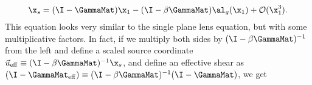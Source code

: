 \begin{equation}
\label{eqn:background}
\x_s = (\I - \GammaMat) \x_1  - (\I - \beta \GammaMat)\al_g(\x_1) + \mathcal{O}(\x_1^3).
\end{equation}
This equation looks very similar to the single plane lens equation, but with some multiplicative factors. In fact, if we multiply both sides by $(\I - \beta \GammaMat)^{-1}$ from the left and define a scaled source coordinate $\vec{u}_{\rm eff} \equiv (\I - \beta \GammaMat)^{-1} \x_s$, and define an effective shear as $(\I -\GammaMat_{\rm eff}) \equiv (\I - \beta\GammaMat)^{-1} (\I - \GammaMat)$, we get
  
  
